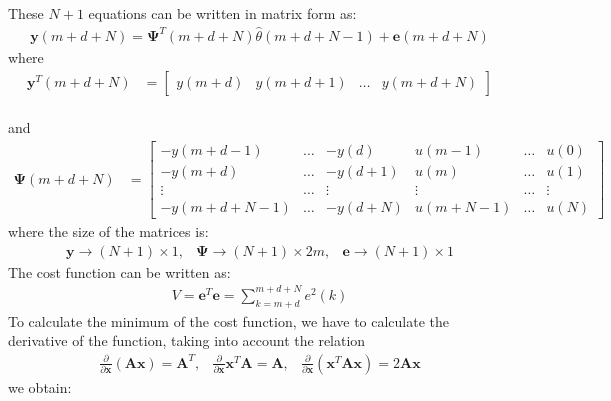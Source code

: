 \documentclass[11pt,a4paper,oneside]{book}
\numberwithin{equation}{section}
\theoremstyle{it}
\theoremstyle{definition}
\begin{document}
These $N+1$ equations can be written in matrix form as:
\begin{equation}\label{eq:11}
	\begin{aligned}
		\boxed{\mathbf{y}(m+d+N) = 
		\mathbf{\Psi}^T(m+d+N)\hat{\theta}(m+d+N-1)+\mathbf{e}(m+d+N)}
	\end{aligned}
\end{equation} 
where 
\begin{equation*}\label{eq:12}
	\begin{aligned}
		\mathbf{y}^T(m+d+N) & = 
		\begin{bmatrix}
			y(m+d) & y(m+d+1) & \dots & y(m+d+N)
		\end{bmatrix}
	\end{aligned}
\end{equation*}\\
and
\begin{equation*}\label{eq:13}
	\begin{aligned}
		\mathbf{\Psi}(m+d+N) & = 
		\begin{bmatrix}
			-y(m+d-1) & \dots & -y(d) & u(m-1) & \dots & u(0) \\[6pt]
			-y(m+d) & \dots & -y(d+1) & u(m) & \dots & u(1) \\[6pt]
			\vdots & \dots & \vdots & \vdots & \dots & \vdots \\[6pt]
			-y(m+d+N-1) & \dots & -y(d+N) & u(m+N-1) & \dots & u(N) 
		\end{bmatrix}
	\end{aligned}
\end{equation*}
where the size of the matrices is:
\begin{equation*}
	\begin{matrix}
		\mathbf{y}\rightarrow (N+1) \times 1, & \mathbf{\Psi}\rightarrow (N+1) 
		\times 2m, & \mathbf{e}\rightarrow (N+1) \times 1
	\end{matrix}
\end{equation*}
The cost function can be written as:
\begin{equation}\label{eq:14}
	\begin{aligned}
		\boxed{V = \mathbf{e}^T\mathbf{e} = \sum_{k=m+d}^{m+d+N}e^2(k)}
	\end{aligned}
\end{equation} 
To calculate the minimum of the cost function, we have to calculate the 
derivative of the function, taking into account the relation $$\begin{matrix} 
\frac{\partial}{\partial\mathbf{x}}(\mathbf{Ax})=\mathbf{A}^T, & 
\frac{\partial}{\partial\mathbf{x}}\mathbf{x}^T\mathbf{A}=\mathbf{A}, & 
\frac{\partial}{\partial\mathbf{x}}(\mathbf{x}^T \mathbf{Ax})=2\mathbf{Ax}  
\end{matrix}$$ we obtain:
\end{document}
